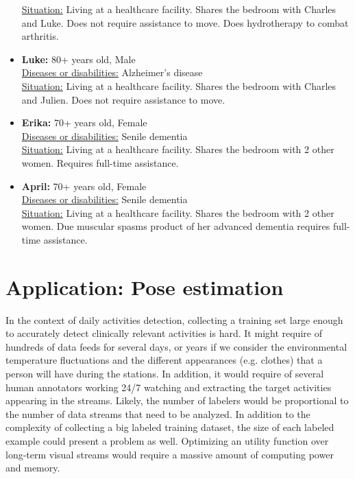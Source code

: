 \documentclass[oneside, twocolumn]{article}
\begin{document}
\begin{itemize}
			\underline{Situation:} Living at a healthcare facility. Shares the bedroom with Charles and Luke. Does not require assistance to move.  Does hydrotherapy to  combat arthritis. \\
	\item \textbf{Luke:} 80+ years old, Male \\
			\underline{Diseases or disabilities:} Alzheimer's disease \\
			\underline{Situation:} Living at a healthcare facility. Shares the bedroom with Charles and Julien. Does not require assistance to move.\\
	\item \textbf{Erika:} 70+ years old, Female \\
			\underline{Diseases or disabilities:} Senile dementia \\
			\underline{Situation:} Living at a healthcare facility. Shares the bedroom with 2 other women. Requires full-time assistance.\\
	\item \textbf{April:} 70+ years old, Female \\
			\underline{Diseases or disabilities:} Senile dementia \\
			\underline{Situation:} Living at a healthcare facility. Shares the bedroom with 2 other women. Due muscular spasms product of her advanced dementia requires full-time assistance. \\
\end{itemize}


\section{Application: Pose estimation}
\label{sec:application}

In the context of daily activities detection, collecting a training set large enough to accurately detect clinically relevant activities is hard. It might require of hundreds of data feeds for several days, or years if we consider the environmental temperature fluctuations and the different appearances (e.g. clothes) that a person will have during the stations. In addition, it would require of several human annotators working 24/7 watching and extracting the target activities appearing in the streams. Likely, the number of labelers would be proportional to the number of data streams that need to be analyzed. In addition to the complexity of collecting a big labeled  training  dataset, the size of each labeled example could present a problem as well. Optimizing an utility function over long-term visual streams would require a massive amount of computing power and memory.
\end{document}

